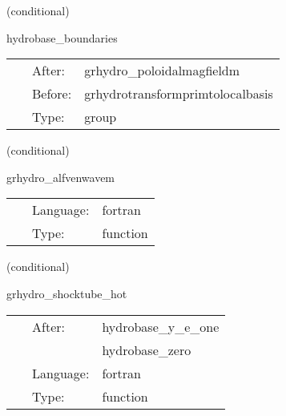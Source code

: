 \vspace{5mm}

   (conditional) 

\hspace{5mm} hydrobase\_boundaries 

\hspace{5mm}{\it call boundary conditions after magnetic field initial data setup } 


\hspace{5mm}

 \begin{tabular*}{160mm}{cll} 
~ & After:  & grhydro\_poloidalmagfieldm \\ 
~ & Before:  & grhydrotransformprimtolocalbasis \\ 
~ & Type:  & group \\ 
\end{tabular*} 


\vspace{5mm}

   (conditional) 

\hspace{5mm} grhydro\_alfvenwavem 

\hspace{5mm}{\it circularly polarized alfven wave initial data } 


\hspace{5mm}

 \begin{tabular*}{160mm}{cll} 
~ & Language:  & fortran \\ 
~ & Type:  & function \\ 
\end{tabular*} 


\vspace{5mm}

   (conditional) 

\hspace{5mm} grhydro\_shocktube\_hot 

\hspace{5mm}{\it hot shocktube initial data } 


\hspace{5mm}

 \begin{tabular*}{160mm}{cll} 
~ & After:  & hydrobase\_y\_e\_one \\ 
~& ~ &hydrobase\_zero\\ 
~ & Language:  & fortran \\ 
~ & Type:  & function \\ 
\end{tabular*} 


